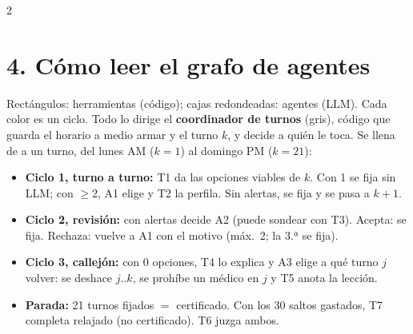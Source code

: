 \documentclass[9pt,a4paper]{extarticle}
\newcommand{\sw}[1]{\textcolor{#1}{\rule{1.6ex}{1.6ex}}}
\begin{document}
\begin{multicols}{2}
\section{4. Cómo leer el grafo de agentes}
Rectángulos: herramientas (código); cajas redondeadas: agentes (LLM). Cada color es un ciclo. Todo lo dirige el \textbf{coordinador de turnos} (gris), código que guarda el horario a medio armar y el turno $k$, y decide a quién le toca. Se llena de a un turno, del lunes AM ($k{=}1$) al domingo PM ($k{=}21$):
\begin{itemize}[label=$\blacktriangleright$]
    \item[\sw{cuno}] \textcolor{cuno}{\textbf{Ciclo 1, turno a turno:}} T1 da las opciones viables de $k$. Con 1 se fija sin LLM; con $\geq$2, A1 elige y T2 la perfila. Sin alertas, se fija y se pasa a $k{+}1$.
    \item[\sw{cdos}] \textcolor{cdos}{\textbf{Ciclo 2, revisión:}} con alertas decide A2 (puede sondear con T3). Acepta: se fija. Rechaza: vuelve a A1 con el motivo (máx.\ 2; la 3.ª se fija).
    \item[\sw{ctres}] \textcolor{ctres}{\textbf{Ciclo 3, callejón:}} con 0 opciones, T4 lo explica y A3 elige a qué turno $j$ volver: se deshace $j..k$, se prohíbe un médico en $j$ y T5 anota la lección.
    \item[\sw{cpar}] \textcolor{cpar}{\textbf{Parada:}} 21 turnos fijados $=$ certificado. Con los 30 saltos gastados, T7 completa relajado (no certificado). T6 juzga ambos.
\end{itemize}


\end{multicols}
\end{document}
